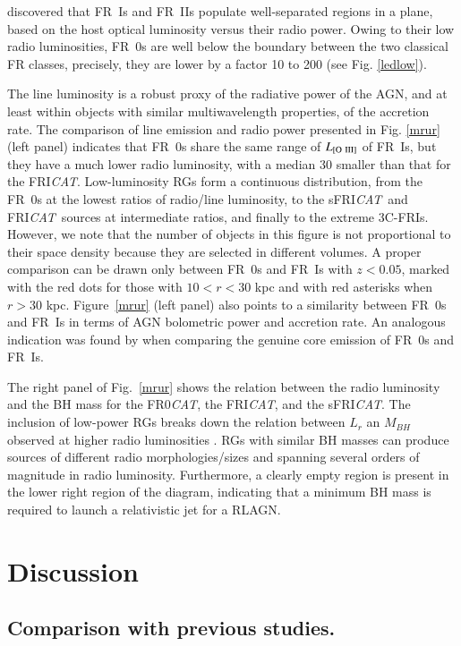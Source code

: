 \documentclass[traditabstract]{aa}
\newcommand{\FR}{FRI{\sl{CAT}}}\newcommand{\FRII}{FRII{\sl{CAT}}}
\newcommand{\FRo}{FR0{\sl{CAT}}}
\newcommand{\sFR}{sFRI{\sl{CAT}}}
\begin{document}
\citet{ledlow96} discovered that FR~Is and FR~IIs populate
well-separated regions in a plane, based on the host optical
luminosity versus their radio power. Owing to their low radio
luminosities, FR~0s are well below the boundary between the two
classical FR classes, precisely, they are lower by a factor 10 to
200 (see Fig. \ref{ledlow}).

The line luminosity is a robust proxy of the radiative power of the AGN,
and at least within objects with similar multiwavelength properties,
of the accretion rate. The comparison of line emission and radio power
presented in Fig. \ref{mrur} (left panel) indicates that FR~0s share
the same range of $L_{\rm [O~III]}$ of FR~Is, but they have a much
lower radio luminosity, with a median 30 smaller than that for the
\FR.  Low-luminosity RGs form a continuous distribution, from the
FR~0s at the lowest ratios of radio/line luminosity, to the \sFR\ and
\FR\ sources at intermediate ratios, and finally to the extreme
3C-FRIs.  However, we note that the number of objects in this figure is
not proportional to their space density because they are selected in
different volumes. A proper comparison can be drawn only between FR~0s
and FR~Is with $z<0.05$, marked with the red dots for those with
$10<r<30$ kpc and with red asterisks when $r>30$ kpc. Figure~\ref{mrur}
(left panel) also points to a similarity between FR~0s and FR~Is in
terms of AGN bolometric power and accretion rate. An analogous
indication was found by \citet{baldi15} when comparing the genuine
core emission of FR~0s and FR~Is.

The right panel of Fig.~\ref{mrur} shows the relation between the radio
luminosity and the BH mass for the \FRo, the \FR, and the \sFR. The inclusion
of low-power RGs breaks down the relation between $L_{r}$ an $M_{BH}$ observed
at higher radio luminosities \citep{lacy01}. RGs with similar BH masses can
produce sources of different radio morphologies/sizes and spanning several orders of
magnitude in radio luminosity. Furthermore, a clearly empty region is present in
the lower right region of the diagram, indicating that a minimum BH mass is
required to launch a relativistic jet for a RLAGN.

\section{Discussion}

\subsection{Comparison with previous studies.}
\end{document}
